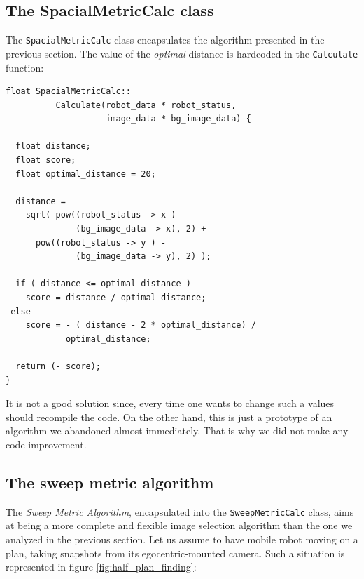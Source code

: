 \subsection{The SpacialMetricCalc class}
\label{concr:iimageselector:spacial_metric_class}

The \texttt{SpacialMetricCalc} class encapsulates the 
algorithm presented in the previous section.
The value of the \textit{optimal} distance is hardcoded in the
\texttt{Calculate} function:
\\
\begin{lstlisting}[caption={\texttt{SweepMetricCalc} class declaration},
    label={code:sweepmetriccalc}]
float SpacialMetricCalc::
          Calculate(robot_data * robot_status, 
                    image_data * bg_image_data) {

  float distance;
  float score;
  float optimal_distance = 20;

  distance = 
    sqrt( pow((robot_status -> x ) - 
              (bg_image_data -> x), 2) +
	  pow((robot_status -> y ) - 
              (bg_image_data -> y), 2) );

  if ( distance <= optimal_distance )
    score = distance / optimal_distance;
 else
    score = - ( distance - 2 * optimal_distance) /
            optimal_distance;

  return (- score);
}
\end{lstlisting}

It is not a good solution since, every time one wants to change 
such a values should recompile the code. 
On the other hand, this is just a prototype of an algorithm we 
abandoned almost immediately. That is why we did not make any 
code improvement.


\subsection{The sweep metric algorithm}
\label{concr:iimageselector:sweep_metric_algorithm}

The  \textit{Sweep Metric Algorithm}, encapsulated into the 
\texttt{SweepMetricCalc} class, aims at being a more 
complete and flexible image selection algorithm than the one 
we analyzed in the previous section.
Let us assume to have  mobile robot moving on a plan, 
taking snapshots from its egocentric-mounted camera.
Such a situation is represented in figure 
\ref{fig:half_plan_finding}:

